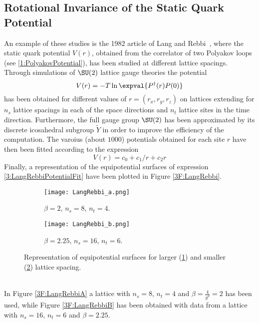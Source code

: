 \subsection{Rotational Invariance of the Static Quark Potential}
An example of these studies is the 1982 article of Lang and Rebbi~\cite{Lang:1982tj}, where the static quark potential $V(r)$, obtained from the correlator of two Polyakov loops (see \eqref{1:PolyakovPotential}), has been studied at different lattice spacings.
Through simulations of $\SU(2)$ lattice gauge theories the potential
\begin{equation}
    V(r) = -T\ln\expval{P^\dagger(r)P(0)} \label{3:LangRebbiPotential}
\end{equation}
has been obtained for different values of $r=(r_x, r_y, r_z)$ on lattices extending for $n_s$ lattice spacings in each of the space directions and $n_t$ lattice sites in the time direction.
Furthermore, the full gauge group $\SU(2)$ has been approximated by its discrete icosahedral subgroup $\tilde{Y}$ in order to improve the efficiency of the computation.
The varoius (about $1000$) potentials obtained for each site $r$ have then been fitted according to the expression
\begin{equation}
    V(r) = c_0 + c_1/r + c_2r \label{3:LangRebbiPotentialFit}
\end{equation}
Finally, a representation of the equipotential surfaces of expression \eqref{3:LangRebbiPotentialFit} have been plotted in Figure \eqref{3F:LangRebbi}.
\begin{figure}[!htbp]
    \centering
    \hfill
    \begin{subfigure}[b]{0.45\textwidth}
        \centering
        \texttt{[image: LangRebbi\_a.png]}
        \caption{$\beta=2$, $n_s=8$, $n_t=4$.}
        \label{3F:LangRebbiA}
    \end{subfigure}
    \begin{subfigure}[b]{0.45\textwidth}
        \centering
        \texttt{[image: LangRebbi\_b.png]}
        \caption{$\beta=2.25$, $n_s=16$, $n_t=6$.}
        \label{3F:LangRebbiB}
    \end{subfigure}
    \hfill
    \caption{Representation of equipotential surfaces for larger (\ref{3F:LangRebbiA}) and smaller (\ref{3F:LangRebbiB}) lattice spacing.}
    \label{3F:LangRebbi}
\end{figure}\\
In Figure \eqref{3F:LangRebbiA} a lattice with $n_s=8$, $n_t=4$ and $\beta=\frac4{g^2}=2$ has been used, while Figure \eqref{3F:LangRebbiB} has been obtained with data from a lattice with $n_s=16$, $n_t=6$ and $\beta=2.25$.
